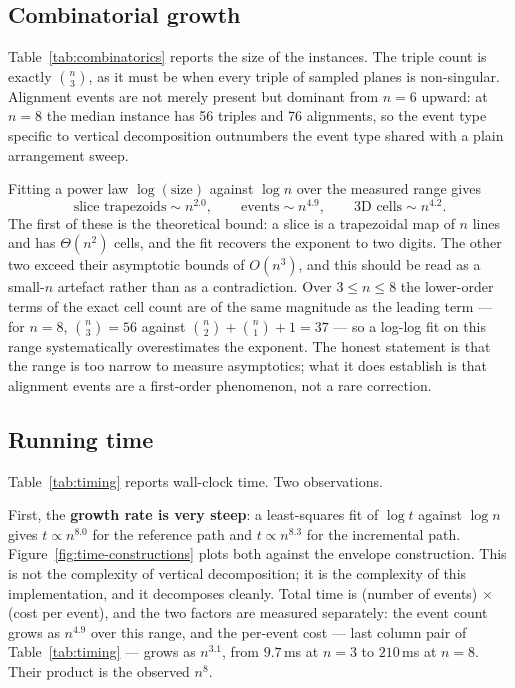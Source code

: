 \documentclass[11pt]{article}
\begin{document}
\subsection{Combinatorial growth}

Table~\ref{tab:combinatorics} reports the size of the instances.  The triple
count is exactly $\binom{n}{3}$, as it must be when every triple of sampled
planes is non-singular.  Alignment events are not merely present but dominant
from $n = 6$ upward: at $n = 8$ the median instance has 56 triples and 76
alignments, so the event type specific to vertical decomposition outnumbers the
event type shared with a plain arrangement sweep.

Fitting a power law $\log(\text{size})$ against $\log n$ over the measured
range gives
\[
  \text{slice trapezoids} \sim n^{2.0},\qquad
  \text{events} \sim n^{4.9},\qquad
  \text{3D cells} \sim n^{4.2}.
\]
The first of these is the theoretical bound: a slice is a trapezoidal map of
$n$ lines and has $\Theta(n^2)$ cells, and the fit recovers the exponent to two
digits.  The other two exceed their asymptotic bounds of $O(n^3)$, and this
should be read as a small-$n$ artefact rather than as a contradiction.  Over
$3 \le n \le 8$ the lower-order terms of the exact cell count are of the same
magnitude as the leading term --- for $n = 8$, $\binom{n}{3} = 56$ against
$\binom{n}{2} + \binom{n}{1} + 1 = 37$ --- so a log-log fit on this range
systematically overestimates the exponent.  The honest statement is that the
range is too narrow to measure asymptotics; what it does establish is that
alignment events are a first-order phenomenon, not a rare correction.



\subsection{Running time}

Table~\ref{tab:timing} reports wall-clock time.  Two observations.



First, the \textbf{growth rate is very steep}: a least-squares fit of $\log t$
against $\log n$ gives $t \propto n^{8.0}$ for the reference path and
$t \propto n^{8.3}$ for the incremental path.  Figure~\ref{fig:time-constructions}
plots both against the envelope construction.  This is not the complexity of
vertical decomposition; it is the complexity of this implementation, and it
decomposes cleanly.  Total time is (number of events) $\times$ (cost per
event), and the two factors are measured separately: the event count grows as
$n^{4.9}$ over this range, and the per-event cost --- last column pair of
Table~\ref{tab:timing} --- grows as $n^{3.1}$, from $9.7$\,ms at $n = 3$ to
$210$\,ms at $n = 8$.  Their product is the observed $n^{8}$.
\end{document}
